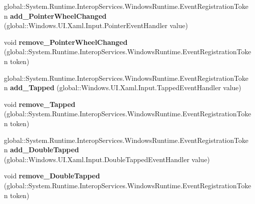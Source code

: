 \begin{DoxyCompactItemize}
\mbox{\label{interface_windows_1_1_u_i_1_1_xaml_1_1_i_u_i_element_a2716b15da4333bb063c9bc09c373340f}} 
global\+::\+System.\+Runtime.\+Interop\+Services.\+Windows\+Runtime.\+Event\+Registration\+Token {\bfseries add\+\_\+\+Pointer\+Wheel\+Changed} (global\+::\+Windows.\+U\+I.\+Xaml.\+Input.\+Pointer\+Event\+Handler value)
\item 
\mbox{\label{interface_windows_1_1_u_i_1_1_xaml_1_1_i_u_i_element_abfc60dbc7d299bf2692903f393ed810f}} 
void {\bfseries remove\+\_\+\+Pointer\+Wheel\+Changed} (global\+::\+System.\+Runtime.\+Interop\+Services.\+Windows\+Runtime.\+Event\+Registration\+Token token)
\item 
\mbox{\label{interface_windows_1_1_u_i_1_1_xaml_1_1_i_u_i_element_a991022bdcf7af68dd9c2bf3964b3bb14}} 
global\+::\+System.\+Runtime.\+Interop\+Services.\+Windows\+Runtime.\+Event\+Registration\+Token {\bfseries add\+\_\+\+Tapped} (global\+::\+Windows.\+U\+I.\+Xaml.\+Input.\+Tapped\+Event\+Handler value)
\item 
\mbox{\label{interface_windows_1_1_u_i_1_1_xaml_1_1_i_u_i_element_a10d8b2df3301a8687ac2a02dbf56e6ad}} 
void {\bfseries remove\+\_\+\+Tapped} (global\+::\+System.\+Runtime.\+Interop\+Services.\+Windows\+Runtime.\+Event\+Registration\+Token token)
\item 
\mbox{\label{interface_windows_1_1_u_i_1_1_xaml_1_1_i_u_i_element_a236a917ea08d09ceea39e12f03cbe17f}} 
global\+::\+System.\+Runtime.\+Interop\+Services.\+Windows\+Runtime.\+Event\+Registration\+Token {\bfseries add\+\_\+\+Double\+Tapped} (global\+::\+Windows.\+U\+I.\+Xaml.\+Input.\+Double\+Tapped\+Event\+Handler value)
\item 
\mbox{\label{interface_windows_1_1_u_i_1_1_xaml_1_1_i_u_i_element_ab7e8271e8ceb0cc5ca0b7bb3423f726f}} 
void {\bfseries remove\+\_\+\+Double\+Tapped} (global\+::\+System.\+Runtime.\+Interop\+Services.\+Windows\+Runtime.\+Event\+Registration\+Token token)
\item 
\mbox{\label{interface_windows_1_1_u_i_1_1_xaml_1_1_i_u_i_element_aa8c0e6b4397f0226baab3ec71083abba}} 

\end{DoxyCompactItemize}
